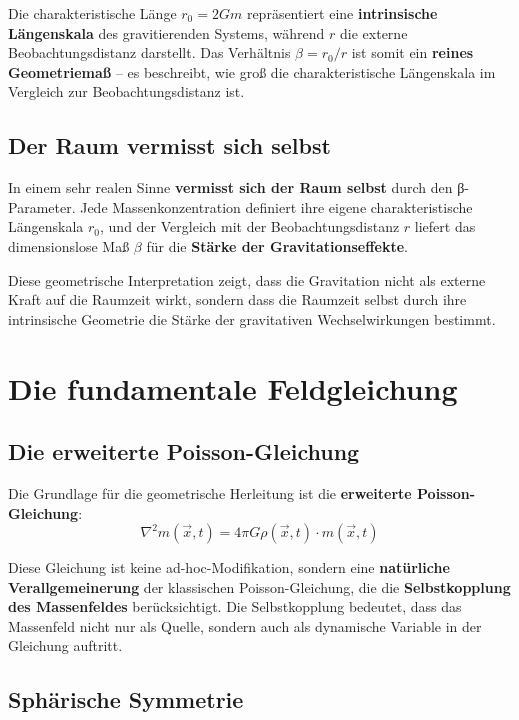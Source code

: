 \documentclass[12pt,a4paper]{report}
\begin{document}
Die charakteristische Länge $r_0 = 2Gm$ repräsentiert eine \textbf{intrinsische Längenskala} des gravitierenden Systems, während $r$ die externe Beobachtungsdistanz darstellt. Das Verhältnis $\beta = r_0/r$ ist somit ein \textbf{reines Geometriemaß} -- es beschreibt, wie groß die charakteristische Längenskala im Vergleich zur Beobachtungsdistanz ist.

\subsection{Der Raum vermisst sich selbst}

In einem sehr realen Sinne \textbf{vermisst sich der Raum selbst} durch den β-Parameter. Jede Massenkonzentration definiert ihre eigene charakteristische Längenskala $r_0$, und der Vergleich mit der Beobachtungsdistanz $r$ liefert das dimensionslose Maß $\beta$ für die \textbf{Stärke der Gravitationseffekte}.

Diese geometrische Interpretation zeigt, dass die Gravitation nicht als externe Kraft auf die Raumzeit wirkt, sondern dass die Raumzeit selbst durch ihre intrinsische Geometrie die Stärke der gravitativen Wechselwirkungen bestimmt.

\section{Die fundamentale Feldgleichung}

\subsection{Die erweiterte Poisson-Gleichung}

Die Grundlage für die geometrische Herleitung ist die \textbf{erweiterte Poisson-Gleichung}:
\begin{equation}
	\nabla^2 m(\vec{x},t) = 4\pi G \rho(\vec{x},t) \cdot m(\vec{x},t)
\end{equation}

Diese Gleichung ist keine ad-hoc-Modifikation, sondern eine \textbf{natürliche Verallgemeinerung} der klassischen Poisson-Gleichung, die die \textbf{Selbstkopplung des Massenfeldes} berücksichtigt. Die Selbstkopplung bedeutet, dass das Massenfeld nicht nur als Quelle, sondern auch als dynamische Variable in der Gleichung auftritt.

\subsection{Sphärische Symmetrie}
\end{document}
